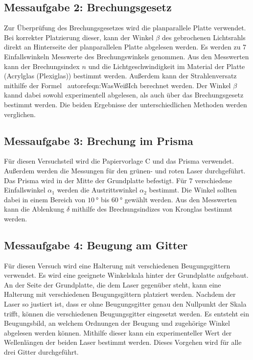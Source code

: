 \subsection{Messaufgabe 2: Brechungsgesetz}
\label{subsec:D_Brechung}
Zur Überprüfung des Brechungsgesetzes wird die planparallele Platte verwendet. Bei korrekter Platzierung dieser, kann der Winkel $\beta$ des gebrochenen Lichtsrahls direkt an Hinterseite
der planparallelen Platte abgelesen werden. Es werden zu 7 Einfallswinkeln Messwerte des Brechungswinkels genommen. Aus den Messwerten kann der Brechungsindex $n$ und die
Lichtgeschwindigkeit im Material der Platte (Acrylglas (Plexiglas)) bestimmt werden. Außerdem kann der Strahlenversatz mithilfe der Formel \ autoref{eqn:WasWeißIch} berechnet werden.
Der Winkel $\beta$ kannd dabei sowohl experimentell abgelesen, als auch über das Brechungsgesetz bestimmt werden. Die beiden Ergebnisse der unterschiedlichen Methoden werden 
verglichen.

\subsection{Messaufgabe 3: Brechung im Prisma}
\label{subsec:D_Prisma}
Für diesen Versuchsteil wird die Papiervorlage C und das Prisma verwendet. Außerdem werden die Messungen für den grünen- und roten Laser durchgeführt.
Das Prisma wird in der Mitte der Grundplatte befestigt. Für 7 verschiedene Einfallswinkel $\alpha_1$ werden die Austrittswinkel $\alpha_2$ bestimmt. Die Winkel
sollten dabei in einem Bereich von $\qty{10}{\degree}$ bis $\qty{60}{\degree}$ gewählt werden. Aus den Messwerten kann die Ablenkung $\delta$ mithilfe des Brechungsindizes 
von Kronglas bestimmt werden.

\subsection{Messaufgabe 4: Beugung am Gitter}
\label{subsec:D_Beugung}
Für diesen Versuch wird eine Halterung mit verschiedenen Beugungsgittern verwendet. Es wird eine geeignete Winkelskala hinter der Grundplatte aufgebaut. An der Seite der
Grundplatte, die dem Laser gegenüber steht, kann eine Halterung mit verschiedenen Beugungsgittern platziert werden. Nachdem der Laser so justiert ist, dass er ohne Beugungsgitter
genau den Nullpunkt der Skala trifft, können die verschiedenen Beugungsgitter eingesetzt werden.
Es entsteht ein Beugungsbild, an welchem Ordnungen der Beugung und zugehörige Winkel abgelesen werden können. Mithilfe dieser kann ein experimenteller Wert 
der Wellenlängen der beiden Laser bestimmt werden. Dieses Vorgehen wird für alle drei Gitter durchgeführt.

